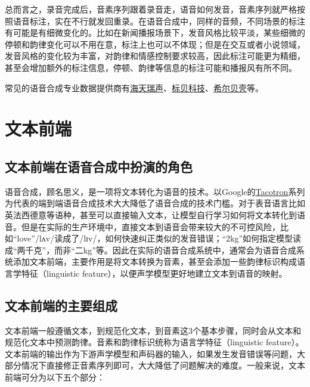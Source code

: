 \documentclass[cn,10pt,math=newtx,citestyle=gb7714-2015,bibstyle=gb7714-2015]{elegantbook}
\begin{document}
总而言之，录音完成后，音素序列跟着录音走，语音如何发音，音素序列就严格按照语音标注，实在不行就发回重录。在语音合成中，同样的音频，不同场景的标注有可能是有细微变化的。比如在新闻播报场景下，发音风格比较平淡，某些细微的停顿和韵律变化可以不用在意，标注上也可以不体现；但是在交互或者小说领域，发音风格的变化较为丰富，对韵律和情感控制要求较高，因此标注可能更为精细，甚至会增加额外的标注信息，停顿、韵律等信息的标注可能和播报风有所不同。

常见的语音合成专业数据提供商有\href{http://www.speechocean.com/welcome.html}{海天瑞声}、\href{https://www.data-baker.com/}{标贝科技}、\href{http://www.aishelltech.com/}{希尔贝壳}等。

\section{文本前端}

\subsection{文本前端在语音合成中扮演的角色}

语音合成，顾名思义，是一项将文本转化为语音的技术。以Google的\href{https://google.github.io/tacotron/}{Tacotron}系列为代表的端到端语音合成技术大大降低了语音合成的技术门槛。对于表音语言比如英法西德意等语种，甚至可以直接输入文本，让模型自行学习如何将文本转化到语音。但是在实际的生产环境中，直接文本到语音会带来较大的不可控风险，比如“love”/lʌv/读成了/lɪv/，如何快速纠正类似的发音错误；“2kg”如何指定模型读成“两千克”，而非“二kg”等。因此在实际的语音合成系统中，通常会为语音合成系统添加文本前端，主要作用是将文本转换为音素，甚至会添加一些韵律标识构成语言学特征（linguistic feature），以便声学模型更好地建立文本到语音的映射。

\subsection{文本前端的主要组成}

文本前端一般遵循文本，到规范化文本，到音素这3个基本步骤，同时会从文本和规范化文本中预测韵律。音素和韵律标识统称为语言学特征（linguistic feature）。文本前端的输出作为下游声学模型和声码器的输入，如果发生发音错误等问题，大部分情况下直接修正音素序列即可，大大降低了问题解决的难度。一般来说，文本前端可分为以下五个部分：
\end{document}
